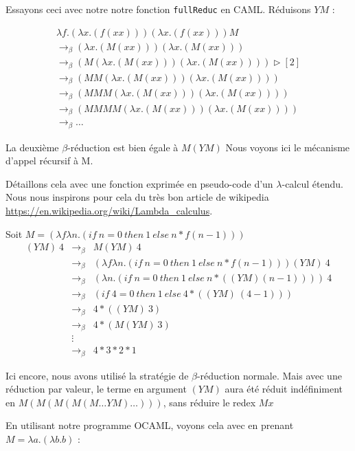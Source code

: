 \documentclass[11pt]{book}
\begin{document}
Essayons ceci avec notre notre fonction \verb+fullReduc+  en CAML.
Réduisons $YM$ :

$$
\begin{array}{l}
\lambda f . (\lambda x . (f (x x))) (\lambda x . (f (x x))) M \\
\rightarrow _\beta (\lambda x . (M (xx)))(\lambda x . (M(xx))) \\
\rightarrow _\beta  (M(\lambda x . (M(xx)))(\lambda x . (M(xx))))  \triangleright [2] \\
\rightarrow _\beta  (MM(\lambda x . (M(xx)))(\lambda x . (M(xx)))) \\
\rightarrow _\beta  (MMM(\lambda x . (M(xx)))(\lambda x . (M(xx)))) \\
\rightarrow _\beta  (MMMM(\lambda x . (M(xx)))(\lambda x . (M(xx)))) \\
\rightarrow _\beta  \ldots
\end{array}
$$


La deuxième $\beta$-r\'{e}duction est bien \'{e}gale \`{a} $M (Y M)$
Nous voyons ici le mécanisme d'appel récursif à M. 

Détaillons cela avec une fonction exprimée en pseudo-code d'un $\lambda$-calcul étendu.
Nous nous inspirons pour cela du très bon article de wikipedia \url{https://en.wikipedia.org/wiki/Lambda_calculus}.


Soit $M = (\lambda f \lambda n .(if\ n=0\ then\ 1\ else\ n*f(n-1)))$
$$
\begin{array}{lll}
(YM)\ 4 & \rightarrow _\beta & M (YM)\ 4 \\
& \rightarrow _\beta & (\lambda f \lambda n .(if\ n=0\ then\ 1\ else\ n*f(n-1))) (YM)\ 4 \\
& \rightarrow _\beta & (\lambda  n . (if\ n=0\ then\ 1\ else\ n*((YM) (n-1))))\ 4 \\
& \rightarrow _\beta & (if\ 4=0\ then\ 1\ else\ 4*((YM)\ (4-1))) \\
& \rightarrow _\beta & 4 * ((YM)\ 3) \\
& \rightarrow _\beta & 4 * (M(YM)\ 3) \\
& \vdots & \\
& \rightarrow _\beta & 4 * 3 * 2 * 1 
\end{array}
$$

Ici encore, nous avons utilisé la stratégie de $\beta$-réduction normale. 
Mais avec une réduction par valeur, le terme en argument $(YM)$ aura été réduit indéfiniment en $M(M(M(M(M\ldots YM)\ldots)))$,
sans réduire le redex $Mx$


En utilisant notre programme OCAML, voyons cela avec en prenant $M = \lambda a. (\lambda b . b) $ :
\end{document}
